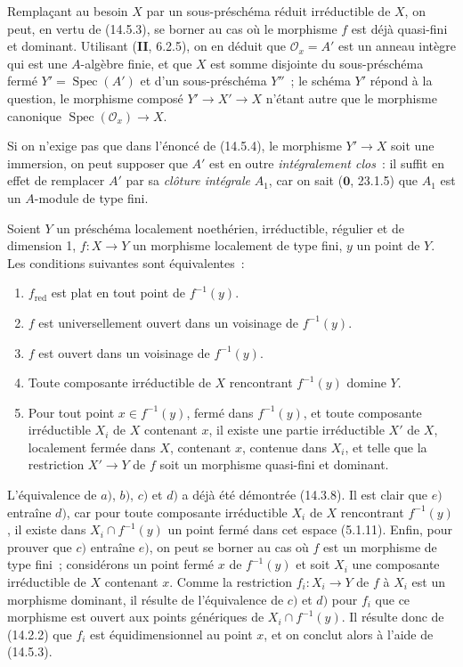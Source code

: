 Remplaçant au besoin $X$ par un sous-préschéma réduit irréductible de $X$, on peut,
en vertu de (14.5.3), se borner au cas où le morphisme $f$ est déjà quasi-fini et
dominant. Utilisant (\textbf{II}, 6.2.5), on en déduit que $\mathcal O_x=A'$ est un
anneau intègre qui est une $A$-algèbre finie, et que $X$ est somme disjointe du
sous-préschéma fermé $Y'=\operatorname{Spec}(A')$ et d'un sous-préschéma $Y''$~; le schéma $Y'$
répond à la question, le morphisme composé $Y'\to X'\to X$ n'étant autre que le
morphisme canonique $\operatorname{Spec}(\mathcal O_x)\to X$.

\begin{remark}[14.5.5]
\label{IV.14.5.5-fr}
Si on n'exige pas que dans l'énoncé de (14.5.4), le morphisme $Y'\to X$ soit une
immersion, on peut supposer que $A'$ est en outre \emph{intégralement clos}~: il
suffit en effet de remplacer $A'$ par sa \emph{clôture intégrale} $A_1$, car on
sait ($\mathbf 0$, 23.1.5) que $A_1$ est un $A$-module de type fini.
\end{remark}

\begin{proposition}[14.5.6]
\label{IV.14.5.6-fr}
Soient $Y$ un préschéma localement noethérien, irréductible, régulier et de
dimension 1, $f:X\to Y$ un morphisme localement de type fini, $y$ un point de $Y$.
Les conditions suivantes sont équivalentes~:
\begin{enumerate}[label=\emph{\alph*)}]
  \item $f_{\mathrm{red}}$ est plat en tout point de $f^{-1}(y)$.


  \item $f$ est universellement ouvert dans un voisinage de $f^{-1}(y)$.
  \item $f$ est ouvert dans un voisinage de $f^{-1}(y)$.
  \item Toute composante irréductible de $X$ rencontrant $f^{-1}(y)$ domine $Y$.
  \item Pour tout point $x\in f^{-1}(y)$, fermé dans $f^{-1}(y)$, et toute
  composante irréductible $X_i$ de $X$ contenant $x$, il existe une partie
  irréductible $X'$ de $X$, localement fermée dans $X$, contenant $x$, contenue
  dans $X_i$, et telle que la restriction $X'\to Y$ de $f$ soit un morphisme
  quasi-fini et dominant.
\end{enumerate}
\end{proposition}

L'équivalence de $a)$, $b)$, $c)$ et $d)$ a déjà été démontrée (14.3.8). Il est
clair que $e)$ entraîne $d)$, car pour toute composante irréductible $X_i$ de $X$
rencontrant $f^{-1}(y)$, il existe dans $X_i\cap f^{-1}(y)$ un point fermé dans cet
espace (5.1.11). Enfin, pour prouver que $c)$ entraîne $e)$, on peut se borner au
cas où $f$ est un morphisme de type fini~; considérons un point fermé $x$ de
$f^{-1}(y)$ et soit $X_i$ une composante irréductible de $X$ contenant $x$. Comme
la restriction $f_i:X_i\to Y$ de $f$ à $X_i$ est un morphisme dominant, il résulte
de l'équivalence de $c)$ et $d)$ pour $f_i$ que ce morphisme est ouvert aux points
génériques de $X_i\cap f^{-1}(y)$. Il résulte donc de (14.2.2) que $f_i$ est
équidimensionnel au point $x$, et on conclut alors à l'aide de (14.5.3).

